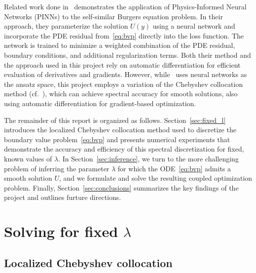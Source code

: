 \documentclass[12pt]{article}
\theoremstyle{definition}\newtheorem{lemma}{Lemma}
\begin{document}
Related work done in~\cite{wang2023asymptotic} demonstrates the application of Physics-Informed Neural Networks (PINNs) to the self-similar Burgers equation problem. In their approach, they parameterize the solution $U(y)$ using a neural network and incorporate the PDE residual from~\eqref{eq:bvp} directly into the loss function. The network is trained to minimize a weighted combination of the PDE residual, boundary conditions, and additional regularization terms. Both their method and the approach used in this project rely on automatic differentiation for efficient evaluation of derivatives and gradients. However, while~\cite{wang2023asymptotic} uses neural networks as the ansatz space, this project employs a variation of the Chebyshev collocation method (cf.~\cite{driscoll2016rectangular}), which can achieve spectral accuracy for smooth solutions, also using automatic differentiation for gradient-based optimization. 

The remainder of this report is organized as follows. Section~\ref{sec:fixed_l} introduces the localized Chebyshev collocation method used to discretize the boundary value problem~\eqref{eq:bvp} and presents numerical experiments that demonstrate the accuracy and efficiency of this spectral discretization for fixed, known values of $\lambda$. In Section~\ref{sec:inference}, we turn to the more challenging problem of inferring the parameter $\lambda$ for which the ODE~\eqref{eq:bvp} admits a smooth solution $U$, and we formulate and solve the resulting coupled optimization problem. Finally, Section~\ref{sec:conclusions} summarizes the key findings of the project and outlines furture directions.

\section{\label{sec:fixed_l}Solving for fixed $\lambda$}
\subsection{Localized Chebyshev collocation}\label{subsec:collocation}
\end{document}
